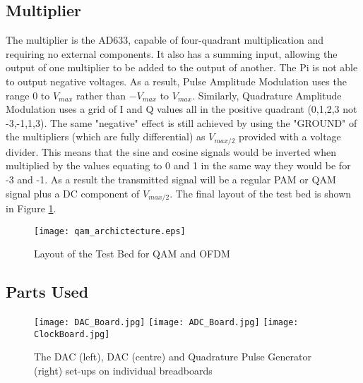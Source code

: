 \documentclass[../main.tex]{subfiles}
\begin{document}
\subsection{Multiplier} \label{sec_Multiplier}

The multiplier is the AD633, capable of four-quadrant multiplication and requiring no external components.
It also has a summing input, allowing the output of one multiplier to be added to the output of another.
The Pi is not able to output negative voltages.
As a result, Pulse Amplitude Modulation uses the range $0$ to $V_{max}$ rather than $-V_{max}$ to $V_{max}$.
Similarly, Quadrature Amplitude Modulation uses a grid of I and Q values all in the positive quadrant (0,1,2,3 not -3,-1,1,3).
The same "negative" effect is still achieved by using the "GROUND" of the multipliers (which are fully differential) as $V_{max/2}$ provided with a voltage divider.
This means that the sine and cosine signals would be inverted when multiplied by the values equating to 0 and 1 in the same way they would be for -3 and -1.
As a result the transmitted signal will be a regular PAM or QAM signal plus a DC component of $V_{max/2}$.
The final layout of the test bed is shown in Figure \ref{fig_QAM Layout}.

\begin{figure}[ht]
	\centering
	\texttt{[image: qam\_archictecture.eps]}
	\caption{Layout of the Test Bed for QAM and OFDM}
	\label{fig_QAM Layout}
\end{figure}

\subsection{Parts Used}

\begin{figure}[ht]
	\centering
	\texttt{[image: DAC\_Board.jpg]}
	\texttt{[image: ADC\_Board.jpg]}
	\texttt{[image: ClockBoard.jpg]}
	\caption{The DAC (left), DAC (centre) and Quadrature Pulse Generator (right) set-ups on individual breadboards}
	\label{fig_Breadboards}
\end{figure}
\end{document}

